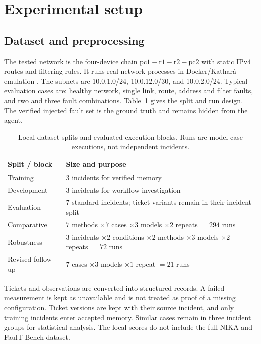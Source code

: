 \documentclass[pdflatex,sn-mathphys-num,iicol]{sn-jnl}
\begin{document}
\section{Experimental setup}\label{sec:setup}
\subsection{Dataset and preprocessing}
The tested network is the four-device chain $\mathrm{pc1}\! -\!\mathrm{r1}\! -\!\mathrm{r2}\! -\!\mathrm{pc2}$ with static IPv4 routes and filtering rules. It runs real network processes in Docker/Kathar\'{a} emulation \cite{kathara,docker}. The subnets are 10.0.1.0/24, 10.0.12.0/30, and 10.0.2.0/24. Typical evaluation cases are: healthy network, single link, route, address and filter faults, and two and three fault combinations. Table~\ref{tab:data} gives the split and run design. The verified injected fault set is the ground truth and remains hidden from the agent.

\begin{table}[t]
\caption{Local dataset splits and evaluated execution blocks. Runs are model-case executions, not independent incidents.}\label{tab:data}
\centering\small
\begin{tabular}{@{}p{2.45cm}p{4.45cm}@{}}
\toprule
Split / block & Size and purpose \\
\midrule
Training & 3 incidents for verified memory \\
Development & 3 incidents for workflow investigation \\
Evaluation & 7 standard incidents; ticket variants remain in their incident split \\
Comparative & $7$ methods $\times7$ cases $\times3$ models $\times2$ repeats $=294$ runs \\
Robustness & $3$ incidents $\times2$ conditions $\times2$ methods $\times3$ models $\times2$ repeats $=72$ runs \\
Revised follow-up & $7$ cases $\times3$ models $\times1$ repeat $=21$ runs \\
\bottomrule
\end{tabular}
\end{table}
Tickets and observations are converted into structured records. A failed measurement is kept as unavailable and is not treated as proof of a missing configuration. Ticket versions are kept with their source incident, and only training incidents enter accepted memory. Similar  cases remain in three incident groups for statistical analysis. The local scores do not include the full NIKA and FaulT-Bench dataset.
\end{document}
